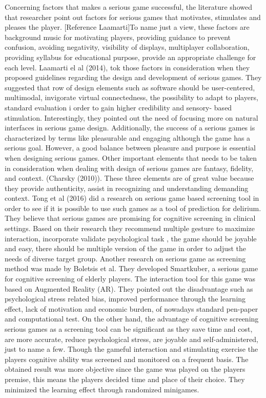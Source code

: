 Concerning factors that makes a serious game successful, the literature showed that researcher point out factors for serious games that motivates, stimulates and pleases the player. [Reference Laamarti]To name just a view, these factors are background music for motivating players, providing guidance to prevent confusion, avoiding negativity, visibility of displays, multiplayer collaboration, providing syllabus for educational purpose, provide an appropriate challenge for each level.
Laamarti el al (2014), tok those factors in consideration when they proposed guidelines regarding the design and development of serious games. They suggested that row of design elements such as software should be user-centered, multimodal, invigorate virtual connectedness, the possibility to adapt to players, standard evaluation i order to gain higher credibility and sensory- based stimulation.
Interestingly, they pointed out the need of focusing more on natural interfaces in serious game design. Additionally, the success of a  serious games is characterized by terms like  pleasurable and engaging although the game has a serious goal. However, a good balance between pleasure and purpose is essential when designing serious games.
Other important elements that needs to be taken in consideration when dealing with design of serious games are fantasy, fidelity, and context. (Charsky (2010)).  These three elements are of great value because they provide authenticity, assist in recognizing and understanding demanding context.
Tong et al (2016) did a research on serious game based screening tool in order to see if it is possible to use such games as a tool of prediction for delirium. They believe that serious games are promising for cognitive screening in clinical settings.  Based on their research they recommend multiple gesture to maximize interaction, incorporate validate psychological task , the game should be joyable and easy, there should be multiple version of the game in order to adjust the needs of diverse target group. 
Another research on serious game as screening method  was made by Boletsis et al. They developed Smartkuber, a serious game for cognitive screening of elderly players. The interaction tool for this game was based on Augmented Reality (AR). They pointed out the disadvantage such as psychological stress related bias, improved performance through the learning effect, lack of motivation and economic burden, of nowadays standard pen-paper and computational test. On the other hand, the advantage of cognitive screening serious games as a screening tool can be significant as they save time and cost, are more accurate, reduce psychological stress, are joyable and self-administered, just to name a few.  Though the gameful interaction and stimulating exercise the players cognitive ability was screened and monitored on a frequent basis. The obtained result was more objective since the game was played on the players premise, this means the players decided time and place of their choice. They minimized the learning effect through randomized minigames. 
 


